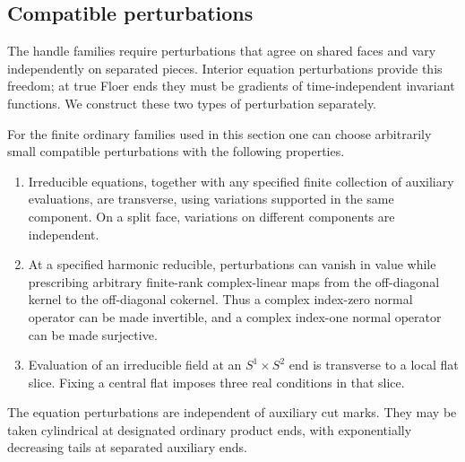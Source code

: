 \subsection{Compatible perturbations}

The handle families require perturbations that agree on shared faces
and vary independently on separated pieces.  Interior equation
perturbations provide this freedom; at true Floer ends they must be
gradients of time-independent invariant functions.  We construct
these two types of perturbation separately.

\begin{lemma}
\label{lem:ordinary:perturbations}
For the finite ordinary families used in this section one can choose
arbitrarily small compatible perturbations with the following
properties.
\begin{enumerate}[label=\textup{(\roman*)}]
\item Irreducible equations, together with any specified finite
collection of auxiliary evaluations, are transverse, using variations
supported in the same component.  On a split face, variations on
different components are independent.
\item At a specified harmonic reducible, perturbations can vanish in
value while prescribing arbitrary finite-rank complex-linear maps
from the off-diagonal kernel to the off-diagonal cokernel.  Thus a
complex index-zero normal operator can be made invertible, and a
complex index-one normal operator can be made surjective.
\item Evaluation of an irreducible field at an $S^1\times S^2$ end
is transverse to a local flat slice.  Fixing a central flat imposes
three real conditions in that slice.
\end{enumerate}
The equation perturbations are independent of auxiliary cut marks.
They may be taken cylindrical at designated ordinary product ends,
with exponentially decreasing tails at separated auxiliary ends.
\end{lemma}
